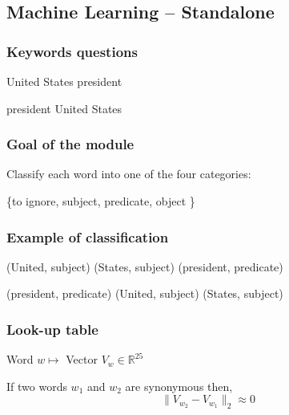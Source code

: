 \subsection{Machine Learning \--- Standalone}

\begin{frame}[fragile]
  \frametitle{Keywords questions}

	
	\begin{center}
  	United States president
	\end{center}

	\begin{center}
  	president United States
	\end{center}

\end{frame}

\begin{frame}[fragile]
\frametitle{Goal of the module}

\alert{Classify} each word into one of the four categories:

\begin{center}
 \{to ignore, subject, predicate, object \}
\end{center}

\end{frame}

\begin{frame}[fragile]
	\frametitle{Example of classification}

	\begin{center}
  	(United, \alert{subject}) (States, \alert{subject}) (president, \alert{predicate})
	\end{center}

	\begin{center}
  	(president, \alert{predicate}) (United, \alert{subject}) (States, \alert{subject})
	\end{center}



\end{frame}

\begin{frame}[fragile]
  \frametitle{Look-up table}

	\begin{center}
	Word $w \mapsto $ Vector $ V_w \in \mathbb{R}^{25}$
	\end{center}

	\begin{center}
	If two words $w_1$ and $w_2$ are \alert{synonymous} then, \newline
	$$ \| V_{w_2} - V_{w_1} \|_2 \approx 0 $$
	
	\end{center}



\end{frame}



